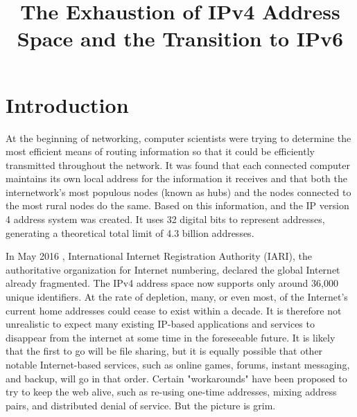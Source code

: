 \documentclass[conference,12pt]{IEEEtran}
\begin{document}
\title{The Exhaustion of IPv4 Address Space and the Transition to IPv6}

\author{
  \and
  \and
}

\maketitle

\section{Introduction}
At the beginning of networking, computer scientists were trying to determine the most efficient means of routing information so that it could be efficiently transmitted throughout the network. It was found that each connected computer maintains its own local address for the information it receives and that both the internetwork's most populous nodes (known as hubs) and the nodes connected to the most rural nodes do the same. Based on this information, and the IP version 4 address system was created. It uses 32 digital bits to represent addresses, generating a theoretical total limit of 4.3 billion addresses.

In May 2016 , International Internet Registration Authority (IARI), the authoritative organization for Internet numbering, declared the global Internet already fragmented. The IPv4 address space now supports only around 36,000 unique identifiers. At the rate of depletion, many, or even most, of the Internet's current home addresses could cease to exist within a decade. It is therefore not unrealistic to expect many existing IP-based applications and services to disappear from the internet at some time in the foreseeable future. It is likely that the first to go will be file sharing, but it is equally possible that other notable Internet-based services, such as online games, forums, instant messaging, and backup, will go in that order. Certain "workarounds" have been proposed to try to keep the web alive, such as re-using one-time addresses, mixing address pairs, and distributed denial of service. But the picture is grim.
\end{document}
